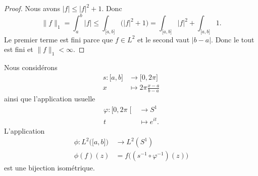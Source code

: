 \begin{proof}
	Nous avons \( | f |\leq | f |^2+1\). Donc
	\begin{equation}
		\| f \|_1=\int_a^b| f |\leq \int_{\mathopen[ a,b\mathclose]}\big( | f |^2+1 \big)=\int_{\mathopen[ a,b\mathclose]}| f |^2+\int_{\mathopen[ a,b\mathclose]}1.
	\end{equation}
	Le premier terme est fini parce que \( f\in L^2\) et le second vaut \( | b-a |\). Donc le tout est fini et \( \| f \|_1<\infty\).
\end{proof}

\begin{proposition}		\label{PROPooLNALooSVNMfe}
	Nous considérons
	\begin{equation}
		\begin{aligned}
			s\colon \mathopen[ a , b \mathclose] & \to \mathopen[ 0 , 2\pi \mathclose] \\
			x                                    & \mapsto 2\pi\frac{ x-a }{ b-a }
		\end{aligned}
	\end{equation}
	ainsi que l'application usuelle
	\begin{equation}
		\begin{aligned}
			\varphi\colon \mathopen[ 0 , 2\pi \mathclose[ & \to S^1          \\
			t                                             & \mapsto  e^{it}.
		\end{aligned}
	\end{equation}
	L'application
	\begin{equation}
		\begin{aligned}
			\phi\colon L^2\big( \mathopen[ a , b \mathclose] \big) & \to L^2(S^1)                                \\
			\phi(f)(z)                                             & =f\big( (s^{-1}\circ \varphi^{-1})(z) \big)
		\end{aligned}
	\end{equation}
	est une bijection isométrique.
\end{proposition}


